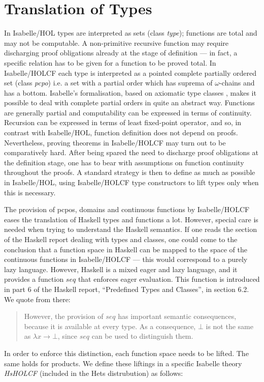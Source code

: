 \documentclass{llncs}
\begin{document}
\section{Translation of Types}
\label{sec:types}


In Isabelle/HOL types are interpreted as sets (class \emph{type});
functions are total and may not be computable. A non-primitive
recursive function may require discharging proof obligations already
at the stage of definition --- in fact, a specific relation has to be
given for a function to be proved total. In Isabelle/HOLCF each type
is interpreted as a pointed complete partially ordered set (class
\emph{pcpo}) i.e. a set with a partial order which has suprema of
$\omega$-chains and has a bottom. Isabelle's formalisation, based on
axiomatic type classes \cite{Wenzel}, makes it possible to deal with
complete partial orders in quite an abstract way.  Functions are
generally partial and computability can be expressed in terms of
continuity. Recursion can be expressed in terms of least fixed-point
operator, and so, in contrast with Isabelle/HOL, function definition
does not depend on proofs.  Nevertheless, proving theorems in
Isabelle/HOLCF may turn out to be comparatively hard.  After being
spared the need to discharge proof obligations at the definition
stage, one has to bear with assumptions on function continuity
throughout the proofs. A standard strategy is then to define as much
as possible in Isabelle/HOL, using Isabelle/HOLCF type constructors to
lift types only when this is necessary.

The provision of pcpos, domains and continuous functions by
Isabelle/HOLCF eases the translation of Haskell types and functions a
lot.  However, special care is needed when trying to understand the
Haskell semantics. If one reads the section of the Haskell report
dealing with types and classes, one could come to the conclusion that
a function space in Haskell can be mapped to the space of the
continuous functions in Isabelle/HOLCF --- this would correspond to a
purely lazy language. However, Haskell is a mixed eager and lazy
language, and it provides a function $seq$ that enforces eager
evaluation. This function is introduced in part 6 of the Haskell
report, ``Predefined Types and Classes'', in section 6.2.  We quote
from there:
\begin{quote}
  However, the provision of $seq$ has important semantic consequences,
  because it is available at every type. As a consequence, $\bot$ is
  not the same as $\lambda x \rightarrow \bot$, since $seq$ can be
  used to distinguish them.
\end{quote}
In order to enforce this distinction, each function space needs to be
lifted. The same holds for products.  We define these liftings in a
specific Isabelle theory \emph{HsHOLCF} (included in the Hets
distrubution) as follows:
\end{document}
